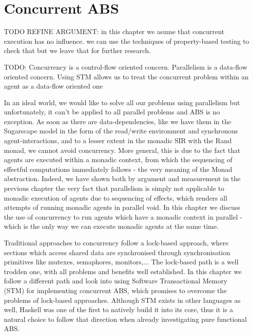 \chapter{Concurrent ABS}
TODO REFINE ARGUMENT: in this chapter we asume that concurrent execution has no influence. we can use the techniques of property-based testing to check that but we leave that for further research.

TODO: Concurrency is a control-flow oriented concern. Parallelism is a data-flow oriented concern. Using STM allows us to treat the concurrent problem within an agent as a data-flow oriented one 

In an ideal world, we would like to solve all our problems using parallelism but unfortunately, it can't be applied to all parallel problems and ABS is no exception. As soon as there are data-dependencies, like we have them in the Sugarscape model in the form of the read/write environment and synchronous agent-interactions, and to a lesser extent in the monadic SIR with the Rand monad, we cannot avoid concurrency. More general, this is due to the fact that agents are executed within a monadic context, from which the  sequencing of effectful computations immediately follows - the very meaning of the Monad abstraction. Indeed, we have shown both by argument and measurement in the previous chapter the very fact that parallelism is simply not applicable to monadic execution of agents due to sequencing of effects, which renders all attempts of running monadic agents in parallel void. In this chapter we discuss the use of concurrency to run agents which have a monadic context in parallel - which is the only way we can execute monadic agents at the same time.

\medskip

Traditional approaches to concurrency follow a lock-based approach, where sections which access shared data are synchronised through synchronisation primitives like mutexes, semaphores, monitors,... The lock-based path is a well trodden one, with all problems and benefits well established. In this chapter we follow a different path and look into using Software Transactional Memory (STM) for implementing concurrent ABS, which promises to overcome the problems of lock-based approaches. Although STM exists in other languages as well, Haskell was one of the first to natively build it into its core, thus it is a natural choice to follow that direction when already investigating pure functional ABS.

